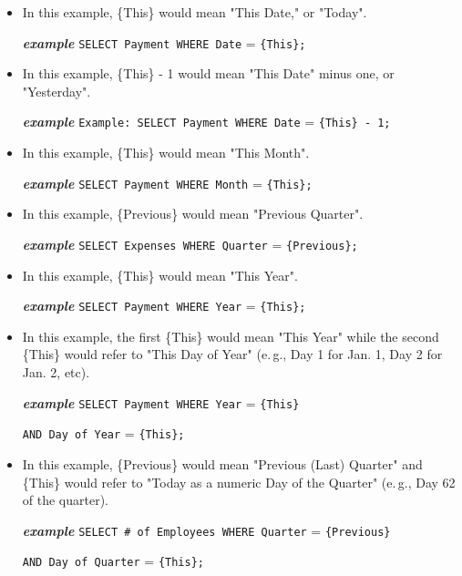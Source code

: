 \documentclass[a4paper, 12pt, titlepage, fleqn]{article}
\begin{document}
\begin{itemize}
\item In this example, \{This\} would mean "This Date," or "Today".

\textbf{\emph{example}}  \hspace{.9cm}\verb=SELECT Payment WHERE Date= = \verb={This};=

\item In this example, \{This\} - 1 would mean "This Date" minus one, or "Yesterday".

\textbf{\emph{example}}  \hspace{.9cm}\verb=Example: SELECT Payment WHERE Date= = \verb={This} - 1;=

\item In this example, \{This\} would mean "This Month".

\textbf{\emph{example}}  \hspace{.9cm}\verb=SELECT Payment WHERE Month= = \verb={This};=

\item In this example, \{Previous\} would mean "Previous Quarter".

\textbf{\emph{example}}  \hspace{.9cm}\verb=SELECT Expenses WHERE Quarter= = \verb={Previous};=

\item In this example, \{This\} would mean "This Year".

\textbf{\emph{example}}  \hspace{.9cm}\verb=SELECT Payment WHERE Year= = \verb={This};=

\item In this example, the first \{This\} would mean "This Year" while the second \{This\} would refer to "This Day of Year" (e.\,g., Day 1 for Jan. 1, Day 2 for Jan. 2, etc).

\textbf{\emph{example}}  \hspace{.9cm}\verb=SELECT Payment WHERE Year= = \verb={This}=

\hspace{2.5cm}\verb=AND Day of Year= = \verb={This};=

\item In this example, \{Previous\} would mean "Previous (Last) Quarter" and \{This\} would refer to "Today as a numeric Day of the Quarter" (e.\,g., Day 62 of the quarter).

\textbf{\emph{example}}  \hspace{.9cm}\verb=SELECT # of Employees WHERE Quarter= = \verb={Previous}=

\hspace{2.5cm}\verb=AND Day of Quarter= = \verb={This};=
\end{itemize}
\end{document}
